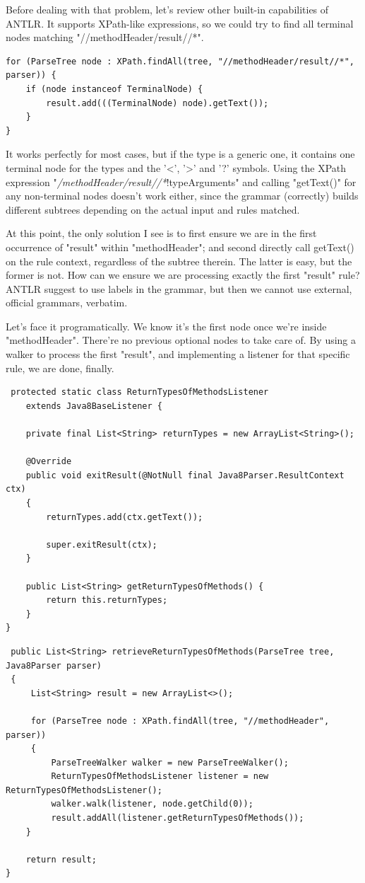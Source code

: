 \documentclass[11pt]{article}
\begin{document}
Before dealing with that problem, let's review other built-in capabilities of ANTLR. It supports XPath-like expressions, so we could try
to find all terminal nodes matching "//methodHeader/result//*". 

\begin{verbatim}
for (ParseTree node : XPath.findAll(tree, "//methodHeader/result//*", parser)) {
    if (node instanceof TerminalNode) {
        result.add(((TerminalNode) node).getText());
    }
}
\end{verbatim}

It works perfectly for most cases, but if the type is a generic one, it contains one terminal node for the types and the '<', '>' and '?' symbols.
Using the XPath expression "\emph{/methodHeader/result//*}!typeArguments" and calling "getText()" for any non-terminal nodes doesn't work either, since
the grammar (correctly) builds different subtrees depending on the actual input and rules matched.

At this point, the only solution I see is to first ensure we are in the first occurrence of "result" within "methodHeader"; and second directly
call getText() on the rule context, regardless of the subtree therein. The latter is easy, but the former is not. How can we ensure we are processing exactly the
first "result" rule? ANTLR suggest to use labels in the grammar, but then we cannot use external, official grammars, verbatim.

Let's face it programatically. We know it's the first node once we're inside "methodHeader". There're no previous optional nodes to take care
of. By using a walker to process the first "result", and implementing a listener for that specific rule, we are done, finally.

\begin{verbatim}
 protected static class ReturnTypesOfMethodsListener
    extends Java8BaseListener {

    private final List<String> returnTypes = new ArrayList<String>();

    @Override
    public void exitResult(@NotNull final Java8Parser.ResultContext ctx)
    {
        returnTypes.add(ctx.getText());

        super.exitResult(ctx);
    }

    public List<String> getReturnTypesOfMethods() {
        return this.returnTypes;
    }
}
\end{verbatim}

\begin{verbatim}
 public List<String> retrieveReturnTypesOfMethods(ParseTree tree, Java8Parser parser)
 {
     List<String> result = new ArrayList<>();

     for (ParseTree node : XPath.findAll(tree, "//methodHeader", parser))
     {
         ParseTreeWalker walker = new ParseTreeWalker();
         ReturnTypesOfMethodsListener listener = new ReturnTypesOfMethodsListener();
         walker.walk(listener, node.getChild(0));
         result.addAll(listener.getReturnTypesOfMethods());
    }

    return result;
}
\end{verbatim}
\end{document}
